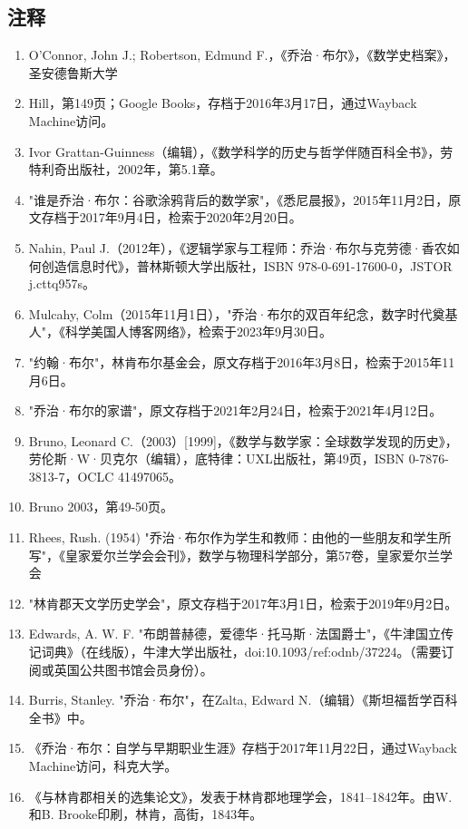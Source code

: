 \subsection{注释}  
\begin{enumerate}
\item O'Connor, John J.; Robertson, Edmund F.，《乔治·布尔》，《数学史档案》，圣安德鲁斯大学  
\item Hill，第149页；Google Books，存档于2016年3月17日，通过Wayback Machine访问。  
\item Ivor Grattan-Guinness（编辑），《数学科学的历史与哲学伴随百科全书》，劳特利奇出版社，2002年，第5.1章。  
\item "谁是乔治·布尔：谷歌涂鸦背后的数学家"，《悉尼晨报》，2015年11月2日，原文存档于2017年9月4日，检索于2020年2月20日。  
\item Nahin, Paul J.（2012年），《逻辑学家与工程师：乔治·布尔与克劳德·香农如何创造信息时代》，普林斯顿大学出版社，ISBN 978-0-691-17600-0，JSTOR j.cttq957s。  
\item Mulcahy, Colm（2015年11月1日），"乔治·布尔的双百年纪念，数字时代奠基人"，《科学美国人博客网络》，检索于2023年9月30日。  
\item "约翰·布尔"，林肯布尔基金会，原文存档于2016年3月8日，检索于2015年11月6日。  
\item "乔治·布尔的家谱"，原文存档于2021年2月24日，检索于2021年4月12日。  
\item Bruno, Leonard C.（2003）[1999]，《数学与数学家：全球数学发现的历史》，劳伦斯·W·贝克尔（编辑），底特律：UXL出版社，第49页，ISBN 0-7876-3813-7，OCLC 41497065。  
\item Bruno 2003，第49-50页。
\item Rhees, Rush. (1954) "乔治·布尔作为学生和教师：由他的一些朋友和学生所写"，《皇家爱尔兰学会会刊》，数学与物理科学部分，第57卷，皇家爱尔兰学会  
\item "林肯郡天文学历史学会"，原文存档于2017年3月1日，检索于2019年9月2日。  
\item Edwards, A. W. F. "布朗普赫德，爱德华·托马斯·法国爵士"，《牛津国立传记词典》（在线版），牛津大学出版社，doi:10.1093/ref:odnb/37224。（需要订阅或英国公共图书馆会员身份）。  
\item Burris, Stanley. "乔治·布尔"，在Zalta, Edward N.（编辑）《斯坦福哲学百科全书》中。  
\item 《乔治·布尔：自学与早期职业生涯》存档于2017年11月22日，通过Wayback Machine访问，科克大学。  
\item 《与林肯郡相关的选集论文》，发表于林肯郡地理学会，1841–1842年。由W.和B. Brooke印刷，林肯，高街，1843年。  

\end{enumerate}
